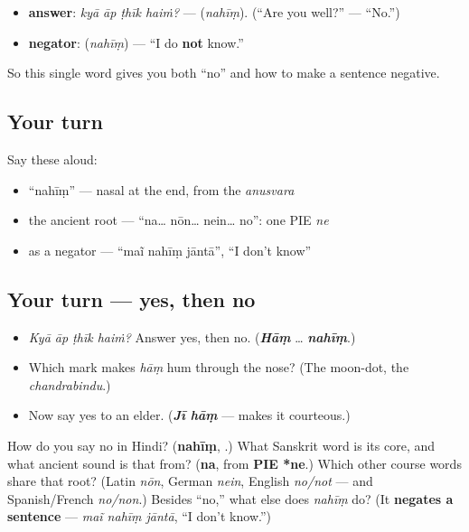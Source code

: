 \begin{itemize}
\raggedright
  \item \textbf{answer}: \emph{kyā āp ṭhīk haiṁ?} — \textbf{} (\emph{nahīṃ}). (\textquotedblleft{}Are you well?\textquotedblright{} — \textquotedblleft{}No.\textquotedblright{})
  \item \textbf{negator}:  \textbf{} (\emph{nahīṃ})  — \textquotedblleft{}I do \textbf{not} know.\textquotedblright{}
\end{itemize}

So this single word gives you both \textquotedblleft{}no\textquotedblright{} and how to make a sentence negative.

\subsection*{Your turn}
Say these aloud:

\begin{itemize}
\raggedright
  \item \textquotedblleft{}nahīṃ\textquotedblright{} — nasal at the end, from the \emph{anusvara}
  \item the ancient root — \textquotedblleft{}na… nōn… nein… no\textquotedblright{}: one PIE \emph{ne}
  \item as a negator — \textquotedblleft{}maĩ nahīṃ jāntā\textquotedblright{}, \textquotedblleft{}I don't know\textquotedblright{}
\end{itemize}

\subsection*{Your turn — yes, then no}
\begin{itemize}
\raggedright
  \item \emph{Kyā āp ṭhīk haiṁ?} Answer yes, then no. (\emph{\textbf{Hāṃ}} … \emph{\textbf{nahīṃ}}.)
  \item Which mark makes \emph{hāṃ} hum through the nose? (The moon-dot, the \emph{chandrabindu}.)
  \item Now say yes to an elder. (\emph{\textbf{Jī hāṃ}} — \textbf{} makes it courteous.)
\end{itemize}

\begin{tcolorbox}[breakable,colback=teal!4,colframe=teal!35!black,title={Before you move on}]
How do you say no in Hindi? (\textbf{nahīṃ}, .) What Sanskrit word is its core, and what ancient sound is that from? (\textbf{na}, from \textbf{PIE *ne}.) Which other course words share that root? (Latin \emph{nōn}, German \emph{nein}, English \emph{no/not} — and Spanish/French \emph{no/non}.) Besides \textquotedblleft{}no,\textquotedblright{} what else does \emph{nahīṃ} do? (It \textbf{negates a sentence} — \emph{maĩ nahīṃ jāntā}, \textquotedblleft{}I don't know.\textquotedblright{})
\end{tcolorbox}
